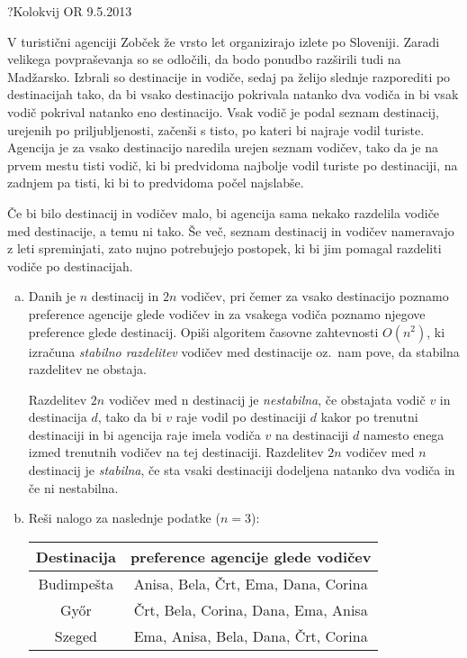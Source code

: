\begin{naloga}{?}{Kolokvij OR 9.5.2013}
\begin{vprasanje}[zobcek]
V turistični agenciji Zobček že vrsto let organizirajo izlete po Sloveniji.
Zaradi velikega povpraševanja so se odločili,
da bodo ponudbo razširili tudi na Madžarsko.
Izbrali so destinacije in vodiče,
sedaj pa želijo slednje razporediti po destinacijah tako,
da bi vsako destinacijo pokrivala natanko dva vodiča
in bi vsak vodič pokrival natanko eno destinacijo.
Vsak vodič je podal seznam destinacij, urejenih po priljubljenosti,
začenši s tisto, po kateri bi najraje vodil turiste.
Agencija je za vsako destinacijo naredila urejen seznam vodičev,
tako da je na prvem mestu tisti vodič,
ki bi predvidoma najbolje vodil turiste po destinaciji,
na zadnjem pa tisti, ki bi to predvidoma počel najslabše.

Če bi bilo destinacij in vodičev malo,
bi agencija sama nekako razdelila vodiče med destinacije, a temu ni tako.
Še več, seznam destinacij in vodičev nameravajo z leti spreminjati,
zato nujno potrebujejo postopek,
ki bi jim pomagal razdeliti vodiče po destinacijah.

\begin{enumerate}[(a)]
\item Danih je $n$ destinacij in $2n$ vodičev,
pri čemer za vsako destinacijo poznamo preference agencije glede vodičev
in za vsakega vodiča poznamo njegove preference glede destinacij.
Opiši algoritem časovne zahtevnosti $O(n^2)$,
ki izračuna {\em stabilno razdelitev} vodičev med destinacije oz.~nam pove,
da stabilna razdelitev ne obstaja.

Razdelitev $2n$ vodičev med n destinacij je {\em nestabilna},
če obstajata vodič $v$ in destinacija $d$,
tako da bi $v$ raje vodil po destinaciji $d$ kakor po trenutni destinaciji
in bi agencija raje imela vodiča $v$ na destinaciji $d$
namesto enega izmed trenutnih vodičev na tej destinaciji.
Razdelitev $2n$ vodičev med $n$ destinacij je {\em stabilna},
če sta vsaki destinaciji dodeljena natanko dva vodiča in če ni nestabilna.

\item Reši nalogo za naslednje podatke ($n = 3$):
\begin{center}
\begin{tabular}{c|c}
Destinacija & preference agencije glede vodičev \\ \hline
Budimpešta  & Anisa, Bela, Črt, Ema, Dana, Corina \\
Győr        & Črt, Bela, Corina, Dana, Ema, Anisa \\
Szeged      & Ema, Anisa, Bela, Dana, Črt, Corina
\end{tabular}


\end{center}
\end{enumerate}
\end{vprasanje}
\end{naloga}
